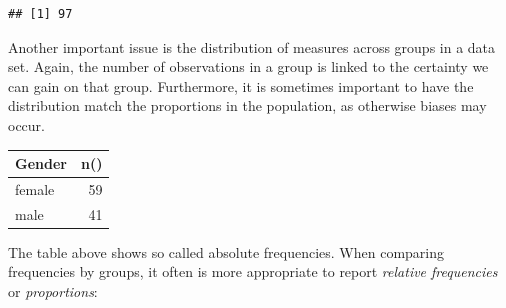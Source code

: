\documentclass[]{svmono}
\newenvironment{Shaded}{\begin{snugshade}}{\end{snugshade}}
\newcommand{\KeywordTok}[1]{\textcolor[rgb]{0.13,0.29,0.53}{\textbf{#1}}}
\newcommand{\DataTypeTok}[1]{\textcolor[rgb]{0.13,0.29,0.53}{#1}}
\newcommand{\StringTok}[1]{\textcolor[rgb]{0.31,0.60,0.02}{#1}}
\newcommand{\ControlFlowTok}[1]{\textcolor[rgb]{0.13,0.29,0.53}{\textbf{#1}}}
\newcommand{\OperatorTok}[1]{\textcolor[rgb]{0.81,0.36,0.00}{\textbf{#1}}}
\newcommand{\NormalTok}[1]{#1}
\theoremstyle{definition}
\theoremstyle{definition}
\theoremstyle{definition}
\theoremstyle{remark}
\begin{document}
\begin{Shaded}
\end{Shaded}

\begin{verbatim}
## [1] 97
\end{verbatim}

Another important issue is the distribution of measures across groups in
a data set. Again, the number of observations in a group is linked to
the certainty we can gain on that group. Furthermore, it is sometimes
important to have the distribution match the proportions in the
population, as otherwise biases may occur.

\begin{Shaded}
\end{Shaded}

\begin{tabular}{l|r}
\hline
Gender & n()\\
\hline
female & 59\\
\hline
male & 41\\
\hline
\end{tabular}

The table above shows so called absolute frequencies. When comparing
frequencies by groups, it often is more appropriate to report
\emph{relative frequencies} or \emph{proportions}:

\begin{Shaded}
\end{Shaded}
\end{document}

